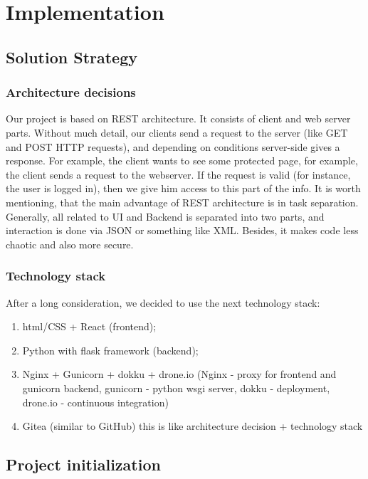 \section{Implementation}

\subsection{Solution Strategy}
\subsubsection{Architecture decisions}
\par Our project is based on REST architecture. It consists of client and web server parts. Without much detail, our clients send a request to the server (like GET and POST HTTP requests), and depending on conditions server-side gives a response. For example, the client wants to see some protected page, for example, the client sends a request to the webserver. If the request is valid (for instance, the user is logged in), then we give him access to this part of the info. It is worth mentioning, that the main advantage of REST architecture is in task separation. Generally, all related to UI and Backend is separated into two parts, and interaction is done via JSON or something like XML. Besides, it makes code less chaotic and also more secure. 
\subsubsection{Technology stack}
\par After a long consideration, we decided to use the next technology stack:  
\begin{enumerate}
\item html/CSS + React (frontend);  

\item Python with flask framework (backend); 

\item Nginx + Gunicorn + dokku + drone.io (Nginx - proxy for frontend and gunicorn backend, gunicorn - python wsgi server, dokku - deployment, drone.io - continuous integration)  

\item Gitea (similar to GitHub) this is like architecture decision + technology stack 
\end{enumerate}


\subsection{Project initialization}
